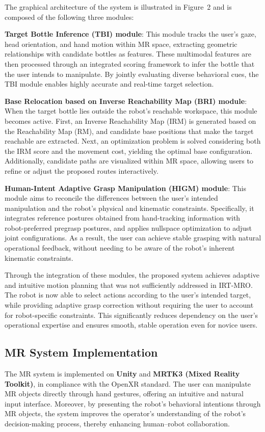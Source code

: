 \documentclass[../../main.tex]{subfiles} %
\begin{document}
The graphical architecture of the system is illustrated in Figure~2 
and is composed of the following three modules:

\medskip
\noindent
\textbf{Target Bottle Inference (TBI) module}:  
This module tracks the user’s gaze, head orientation, and hand motion within MR space, 
extracting geometric relationships with candidate bottles as features.  
These multimodal features are then processed through an integrated scoring framework 
to infer the bottle that the user intends to manipulate.  
By jointly evaluating diverse behavioral cues, 
the TBI module enables highly accurate and real-time target selection.

\medskip
\noindent
\textbf{Base Relocation based on Inverse Reachability Map (BRI) module}:  
When the target bottle lies outside the robot’s reachable workspace, 
this module becomes active.  
First, an Inverse Reachability Map (IRM) is generated based on the Reachability Map (RM), 
and candidate base positions that make the target reachable are extracted.  
Next, an optimization problem is solved considering both the IRM score 
and the movement cost, yielding the optimal base configuration.  
Additionally, candidate paths are visualized within MR space, 
allowing users to refine or adjust the proposed routes interactively.

\medskip
\noindent
\textbf{Human-Intent Adaptive Grasp Manipulation (HIGM) module}:  
This module aims to reconcile the differences between the user’s intended manipulation 
and the robot’s physical and kinematic constraints.  
Specifically, it integrates reference postures obtained from hand-tracking information 
with robot-preferred pregrasp postures, 
and applies nullspace optimization to adjust joint configurations.  
As a result, the user can achieve stable grasping with natural operational feedback, 
without needing to be aware of the robot’s inherent kinematic constraints.

\medskip
Through the integration of these modules, 
the proposed system achieves adaptive and intuitive motion planning 
that was not sufficiently addressed in IRT-MRO.  
The robot is now able to select actions according to the user’s intended target, 
while providing adaptive grasp correction without requiring the user to 
account for robot-specific constraints.  
This significantly reduces dependency on the user’s operational expertise 
and ensures smooth, stable operation even for novice users.

\subsection{MR System Implementation}
The MR system is implemented on \textbf{Unity} and \textbf{MRTK3 (Mixed Reality Toolkit)}, 
in compliance with the OpenXR standard.  
The user can manipulate MR objects directly through hand gestures, 
offering an intuitive and natural input interface.  
Moreover, by presenting the robot’s behavioral intentions through MR objects, 
the system improves the operator’s understanding of the robot’s decision-making process, 
thereby enhancing human–robot collaboration.
\end{document}
